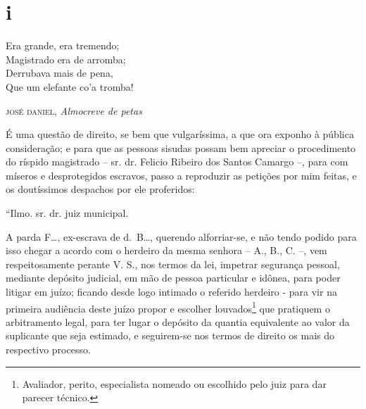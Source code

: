 \section{i}

\epigraph{Era grande, era tremendo;\\
Magistrado era de arromba;\\
Derrubava mais de pena,\\
Que um elefante co'a tromba!}{\textsc{josé daniel}\footnotemark, \emph{Almocreve de petas}\footnotemark}




É uma questão de direito, se bem que vulgaríssima, a que ora exponho à
pública consideração; e para que as pessoas sisudas possam bem apreciar
o procedimento do ríspido magistrado -- sr. dr. Felicio Ribeiro dos
Santos Camargo --, para com míseros e desprotegidos escravos, passo a
reproduzir as petições por mim feitas, e os doutíssimos despachos por
ele proferidos:

``Ilmo. sr. dr. juiz municipal.

A parda F\ldots{}, ex-escrava de d.~B\ldots{}, querendo alforriar-se, e não tendo
podido para isso chegar a acordo com o herdeiro da mesma senhora -- A.,
B., C. --, vem respeitosamente perante V. S., nos termos da lei,
impetrar segurança pessoal, mediante depósito judicial, em mão de pessoa
particular e idônea, para poder litigar em juízo; ficando desde logo
intimado o referido herdeiro - para vir na primeira audiência deste
juízo propor e escolher louvados\footnote{ Avaliador, perito,
  especialista nomeado ou escolhido pelo juiz para dar parecer técnico.}
que pratiquem o arbitramento legal, para ter lugar o depósito da quantia
equivalente ao valor da suplicante que seja estimado, e seguirem-se nos
termos de direito os mais do respectivo processo.

